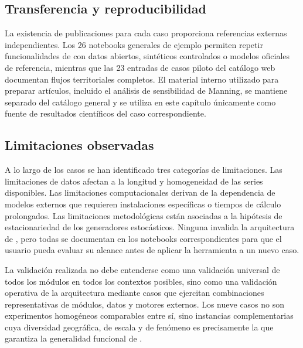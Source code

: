 \subsection{Transferencia y reproducibilidad}

La existencia de publicaciones para cada caso proporciona referencias externas independientes. Los 26 notebooks generales de ejemplo permiten repetir funcionalidades de \hydra con datos abiertos, sintéticos controlados o modelos oficiales de referencia, mientras que las 23 entradas de casos piloto del catálogo web documentan flujos territoriales completos. El material interno utilizado para preparar artículos, incluido el análisis de sensibilidad de Manning, se mantiene separado del catálogo general y se utiliza en este capítulo únicamente como fuente de resultados científicos del caso correspondiente.

\subsection{Limitaciones observadas}

A lo largo de los casos se han identificado tres categorías de limitaciones. Las limitaciones de datos afectan a la longitud y homogeneidad de las series disponibles. Las limitaciones computacionales derivan de la dependencia de modelos externos que requieren instalaciones específicas o tiempos de cálculo prolongados. Las limitaciones metodológicas están asociadas a la hipótesis de estacionariedad de los generadores estocásticos. Ninguna invalida la arquitectura de \hydra, pero todas se documentan en los notebooks correspondientes para que el usuario pueda evaluar su alcance antes de aplicar la herramienta a un nuevo caso.

La validación realizada no debe entenderse como una validación universal de todos los módulos en todos los contextos posibles, sino como una validación operativa de la arquitectura mediante casos que ejercitan combinaciones representativas de módulos, datos y motores externos. Los nueve casos no son experimentos homogéneos comparables entre sí, sino instancias complementarias cuya diversidad geográfica, de escala y de fenómeno es precisamente la que garantiza la generalidad funcional de \hydra.
